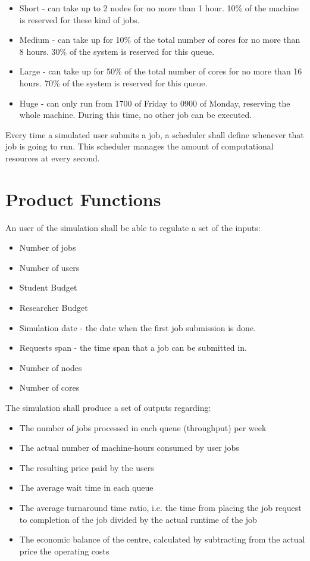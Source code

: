 \documentclass{scrreprt}
\begin{document}
\begin{itemize}
\item Short - can take up to 2 nodes for no more than 1 hour. 10\% of the machine is reserved for these kind of jobs.
\item Medium - can take up for 10\% of the total number of cores for no more than 8 hours. 30\% of the system is reserved for this queue.
\item Large - can take up for 50\% of the total number of cores for no more than 16 hours. 70\% of the system is reserved for this queue.
\item Huge - can only run from 1700 of Friday to 0900 of Monday, reserving the whole machine. During this time, no other job can be executed.
\end{itemize}

\par Every time a simulated user submits a job, a scheduler shall define whenever that job is going to run. This scheduler manages the amount of computational resources at every second.


\section{Product Functions}
An user of the simulation shall be able to regulate a set of the inputs:

\begin{itemize}
\item Number of jobs \footnotemark
\item Number of users \footnotemark[\value{footnote}]
\item Student Budget \footnotemark[\value{footnote}]
\item Researcher Budget \footnotemark[\value{footnote}]
\item Simulation date - the date when the first job submission is done.
\item Requests span - the time span that a job can be submitted in.
\item Number of nodes
\item Number of cores
\end{itemize}

The simulation shall produce a set of outputs regarding:

\begin{itemize}
\item The number of jobs processed in each queue (throughput) per week
\item The actual number of machine-hours consumed by user jobs
\item The resulting price paid by the users
\item The average wait time in each queue
\item The average turnaround time ratio, i.e. the time from placing the job request to completion of the job divided by the actual runtime of the job
\item The economic balance of the centre, calculated by subtracting from the actual price the operating costs
\end{itemize}
\end{document}
